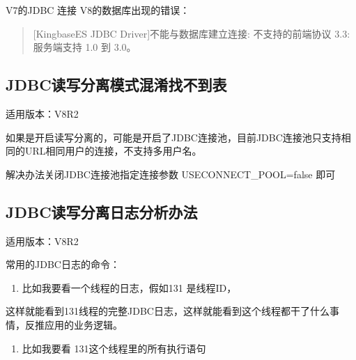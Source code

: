 \documentclass[letterpaper,10pt,english]{sphinxmanual}
\begin{document}
V7的JDBC 连接 V8的数据库出现的错误：
\begin{quote}

{[}KingbaseES JDBC Driver{]}不能与数据库建立连接: 不支持的前端协议 3.3: 服务端支持 1.0 到 3.0。
\end{quote}


\subsection{JDBC读写分离模式混淆找不到表}
\label{\detokenize{interface/jdbc:id12}}
适用版本：V8R2

如果是开启读写分离的，可能是开启了JDBC连接池，目前JDBC连接池只支持相同的URL相同用户的连接，不支持多用户名。

解决办法关闭JDBC连接池指定连接参数 USECONNECT\_POOL=false 即可


\subsection{JDBC读写分离日志分析办法}
\label{\detokenize{interface/jdbc:id13}}
适用版本：V8R2

常用的JDBC日志的命令：
\begin{enumerate}
%
\item {} 
比如我要看一个线程的日志，假如131 是线程ID，

\end{enumerate}

\begin{sphinxVerbatim}[commandchars=\\\{\}]
 \PYG{l+s+s2}{[131}\PYG{l+s+s2}{]}   
\end{sphinxVerbatim}

这样就能看到131线程的完整JDBC日志，这样就能看到这个线程都干了什么事情，反推应用的业务逻辑。
\begin{enumerate}
%
\setcounter{enumi}{1}
\item {} 
比如我要看 131这个线程里的所有执行语句

\end{enumerate}

\begin{sphinxVerbatim}[commandchars=\\\{\}]
    
\end{sphinxVerbatim}
\end{document}
